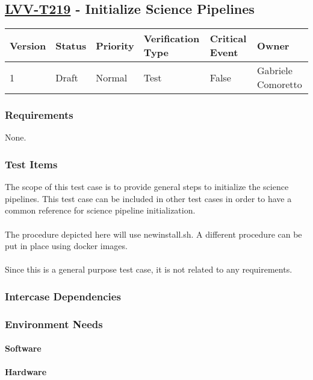 \subsection{\href{https://jira.lsstcorp.org/secure/Tests.jspa\#/testCase/LVV-T219}{LVV-T219}
    - Initialize Science Pipelines}\label{lvv-t219}

\begin{longtable}[]{llllll}
\toprule
Version & Status & Priority & Verification Type & Critical Event & Owner
\\\midrule
1 & Draft & Normal &
Test & False & Gabriele Comoretto
\\\bottomrule
\end{longtable}

\subsubsection{Requirements}
    None.

\subsubsection{Test Items}
The scope of this test case is to provide general steps to initialize
the science pipelines. This test case can be included in other test
cases in order to have a common reference for science pipeline
initialization.\\
~\\
The procedure depicted here will use newinstall.sh. A different
procedure can be put in place using docker images.\\
~\\
Since this is a general purpose test case, it is not related to any
requirements.



\subsubsection{Intercase Dependencies}

\subsubsection{Environment Needs}

\paragraph{Software}

\paragraph{Hardware}

